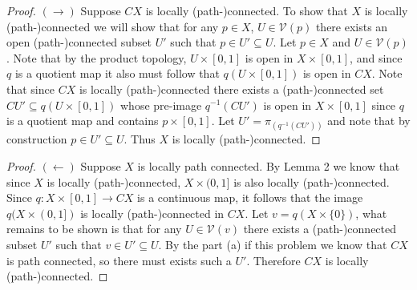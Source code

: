\documentclass{homework651}
\begin{document}
\begin{problems}
\begin{enumerate}
    \begin{proof}$(\rightarrow)$ Suppose $CX$ is locally (path-)connected. To show that $X$ is locally (path-)connected we will show that for any $p \in X$, $U \in \mathcal{V}(p)$ there exists an open (path-)connected subset $U'$ such that $p \in U' \subseteq U$. Let $p \in X$ and $U \in \mathcal{V}(p)$. Note that by the product topology, $U \times [0, 1]$ is open in $X \times [0, 1]$, and since $q$ is a quotient map it also must follow that $q(U \times [0, 1])$ is open in $CX$. Note that since $CX$ is locally (path-)connected there exists a (path-)connected set $CU' \subseteq q(U \times [0, 1])$ whose pre-image $q^{-1}(CU')$ is open in $X \times [0, 1]$ since $q$ is a quotient map and contains $p \times [0, 1]$. Let $U' = \pi_(q^{-1}(CU'))$ and note that by construction $p \in U' \subseteq U$. Thus $X$ is locally (path-)connected. 
        
    \end{proof}
    \begin{proof}$(\leftarrow)$ Suppose $X$ is locally path connected. By Lemma 2 we know that since $X$ is locally (path-)connected, $X \times (0, 1]$ is also locally (path-)connected. Since $q: X \times [0, 1] \to CX$ is a continuous map, it follows that the image $q(X \times (0, 1])$ is locally (path-)connected in $CX$. Let $v = q(X \times \{0\})$, what remains to be shown is that for any $U \in \mathcal{V}(v)$ there exists a (path-)connected subset $U'$ such that $v \in U' \subseteq U$. By the part (a) if this problem we know that $CX$ is path connected, so there must exists such a $U'$. Therefore $CX$ is locally (path-)connected.
    \end{proof}


\end{enumerate}


\end{problems}
\end{document}
